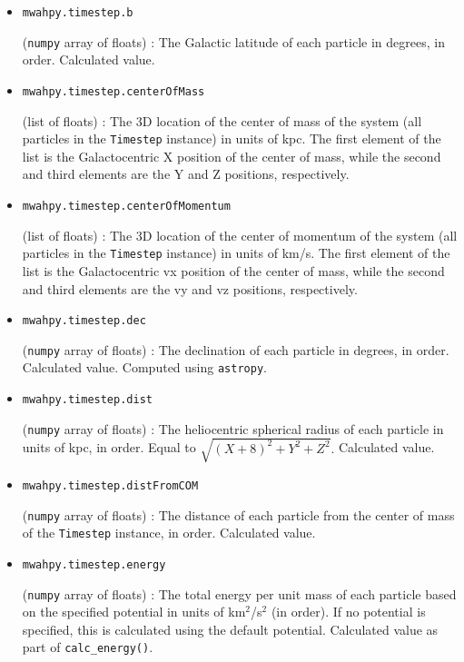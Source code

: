 \documentclass{article}
\begin{document}
\begin{itemize}

\item \verb!mwahpy.timestep.b!

(\verb!numpy! array of floats) : The Galactic latitude of each particle in degrees, in order. Calculated value.

\item \verb!mwahpy.timestep.centerOfMass!

(list of floats) : The 3D location of the center of mass of the system (all particles in the \verb!Timestep! instance) in units of kpc. The first element of the list is the Galactocentric X position of the center of mass, while the second and third elements are the Y and Z positions, respectively.

\item \verb!mwahpy.timestep.centerOfMomentum!

(list of floats) : The 3D location of the center of momentum of the system (all particles in the \verb!Timestep! instance) in units of km/s. The first element of the list is the Galactocentric vx position of the center of mass, while the second and third elements are the vy and vz positions, respectively.

\item \verb!mwahpy.timestep.dec!

(\verb!numpy! array of floats) : The declination of each particle in degrees, in order. Calculated value. Computed using \verb!astropy!.

\item \verb!mwahpy.timestep.dist!

(\verb!numpy! array of floats) : The heliocentric spherical radius of each particle in units of kpc, in order. Equal to $\sqrt{(X + 8)^2 + Y^2 + Z^2}.$ Calculated value.

\item \verb!mwahpy.timestep.distFromCOM!

(\verb!numpy! array of floats) : The distance of each particle from the center of mass of the \verb!Timestep! instance, in order. Calculated value.

\item \verb!mwahpy.timestep.energy!

(\verb!numpy! array of floats) : The total energy per unit mass of each particle based on the specified potential in units of km$^2$/s$^2$ (in order). If no potential is specified, this is calculated using the default \mwahpy potential. Calculated value as part of \verb!calc_energy()!.


\end{itemize}
\end{document}
